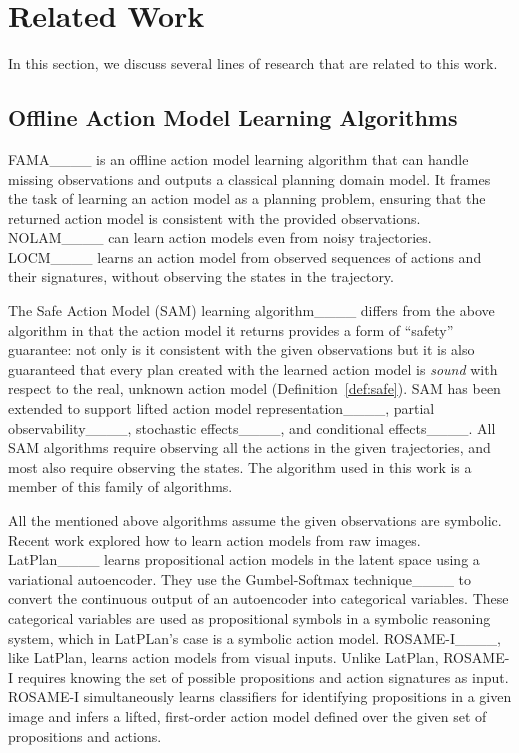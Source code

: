 \section{Related Work}
\label{sec:related-work}
In this section, we discuss several lines of research that are related to this work. 

\subsection{Offline Action Model Learning Algorithms}
\label{sec:related-offline-action-model-learning}


FAMA____ is an offline action model learning algorithm that can handle missing observations and outputs a classical planning domain model. 
It frames the task of learning an action model as a planning problem, ensuring that the returned action model is consistent with the provided observations.
NOLAM____ can learn action models even from noisy trajectories. 
LOCM____ learns an action model from observed sequences of actions and their signatures, without observing the states in the trajectory.

The Safe Action Model (SAM) learning algorithm____ differs from the above algorithm in that the action model it returns provides a form of ``safety'' guarantee: not only is it consistent with the given observations but it is also guaranteed that every plan created with the learned action model is \emph{sound} with respect to the real, unknown action model (Definition~\ref{def:safe}).
SAM has been extended to support lifted action model representation____, partial observability____, stochastic effects____, and conditional effects____. 
All SAM algorithms require observing all the actions in the given trajectories, and most
also require observing the states. 
The \nsam algorithm used in this work is a member of this family of algorithms. 

All the mentioned above algorithms assume the given observations are symbolic. 
Recent work explored how to learn action models from raw images. 
LatPlan____ learns propositional action models in the latent space using a variational autoencoder. 
They use the Gumbel-Softmax technique____ to convert the continuous output of an autoencoder into categorical variables. 
These categorical variables are used as propositional symbols in a symbolic reasoning system, which in LatPLan's case is a symbolic action model. 
ROSAME-I____, like LatPlan, learns action models from visual inputs. 
Unlike LatPlan, ROSAME-I requires knowing the set of possible propositions and action signatures as input.
ROSAME-I simultaneously learns classifiers for identifying propositions in a given image and infers a lifted, first-order action model defined over the given set of propositions and actions. 


